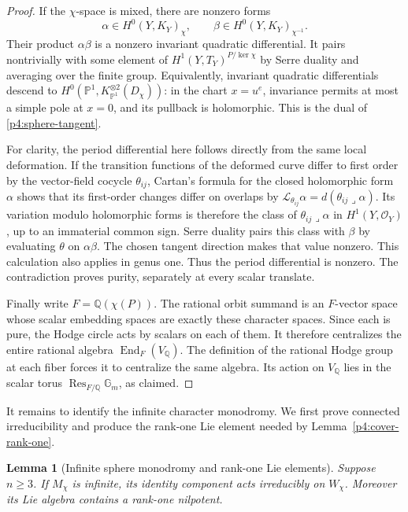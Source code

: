 \documentclass[11pt]{article}
\newcommand{\Q}{\mathbb Q}
\theoremstyle{plain}
\newtheorem{lemma}[theorem]{Lemma}
\theoremstyle{definition}
\theoremstyle{remark}
\numberwithin{equation}{section}
\begin{document}
\begin{proof}
If the $\chi$-space is mixed, there are nonzero forms
\[
 \alpha\in H^0(Y,K_Y)_\chi,
 \qquad \beta\in H^0(Y,K_Y)_{\chi^{-1}}.
\]
Their product $\alpha\beta$ is a nonzero invariant quadratic
differential.  It pairs nontrivially with some element of
$H^1(Y,T_Y)^{P/\ker\chi}$ by Serre duality and averaging over the
finite group.  Equivalently, invariant quadratic differentials
descend to $H^0(\mathbb P^1,K_{\mathbb P^1}^{\otimes2}(D_\chi))$:
in the chart $x=u^e$, invariance permits at most a simple pole at
$x=0$, and its pullback is holomorphic.  This is the dual of
\eqref{p4:sphere-tangent}.

For clarity, the period differential here follows directly from
the same local deformation.  If the transition functions of the
deformed curve differ to first order by the vector-field cocycle
$\theta_{ij}$, Cartan's formula for the closed holomorphic form
$\alpha$ shows that its first-order changes differ on overlaps by
$\mathcal L_{\theta_{ij}}\alpha
 =d(\theta_{ij}\mathbin{\lrcorner}\alpha)$.
Its variation modulo holomorphic forms is therefore the class of
$\theta_{ij}\mathbin{\lrcorner}\alpha$ in $H^1(Y,\mathcal O_Y)$,
up to an immaterial common sign.  Serre duality pairs this class with
$\beta$ by evaluating $\theta$ on $\alpha\beta$.  The chosen tangent
direction makes that value nonzero.  This calculation also applies
in genus one.  Thus the period differential is nonzero.  The
contradiction proves purity, separately at every scalar translate.

Finally write $F=\Q(\chi(P))$.  The rational orbit summand is an
$F$-vector space whose scalar embedding spaces are exactly these
character spaces.  Since each is pure, the Hodge circle acts by
scalars on each of them.  It therefore centralizes the entire
rational algebra $\operatorname{End}_F(V_\Q)$.  The definition of the rational
Hodge group at each fiber forces it to centralize the same algebra.  Its action
on $V_\Q$ lies in the scalar torus
$\operatorname{Res}_{F/\Q}\mathbb G_m$, as claimed.
\end{proof}

It remains to identify the infinite character monodromy.  We first
prove connected irreducibility and produce the rank-one Lie element
needed by Lemma~\ref{p4:cover-rank-one}.

\begin{lemma}[Infinite sphere monodromy and rank-one Lie elements]\label{p4:sphere-connected-irreducible}
Suppose $n\ge3$.  If $M_\chi$ is infinite, its identity component
acts irreducibly on $W_\chi$.
Moreover its Lie algebra contains a rank-one nilpotent.
\end{lemma}
\end{document}
